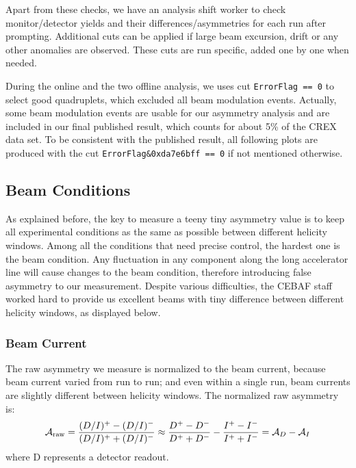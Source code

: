 Apart from these checks, we have an analysis shift worker to check monitor/detector 
yields and their differences/asymmetries for each run after prompting. Additional
cuts can be applied if large beam excursion, drift or any other anomalies are observed. 
These cuts are run specific, added one by one when needed.

During the online and the two offline analysis, we uses cut \verb|ErrorFlag == 0|
to select good quadruplets, which excluded all beam modulation events. Actually, 
some beam modulation events are usable for our asymmetry analysis and are
included in our final published result, which counts for about 5\% of the CREX data set.
To be consistent with the published result, all following plots are produced with the cut 
\verb|ErrorFlag&0xda7e6bff == 0| if not mentioned otherwise. 

\subsection{Beam Conditions}
As explained before, the key to measure a teeny tiny asymmetry value is to 
keep all experimental conditions as the same as possible between different 
helicity windows. Among all the conditions that need precise control, the 
hardest one is the beam condition. Any fluctuation in any component along the 
long accelerator line will cause changes to the beam condition, therefore introducing false 
asymmetry to our measurement. Despite various difficulties, the CEBAF staff worked 
hard to provide us excellent beams with tiny difference between different helicity 
windows, as displayed below.

\subsubsection{Beam Current}
The raw asymmetry we measure is normalized to the beam current, because beam
current varied from run to run; and even within a single run, beam currents are 
slightly different between helicity windows. The normalized raw asymmetry is:
\begin{equation}
    \mathcal{A}_{\text{raw}} = \frac{(D/I)^+ - (D/I)^-}{(D/I)^+ + (D/I)^-}
	\approx \frac{D^+ - D^-}{D^+ + D^-} - \frac{I^+ - I^-}{I^+ + I^-}
	= \mathcal{A}_D - \mathcal{A}_I
\end{equation}
where D represents a detector readout.

